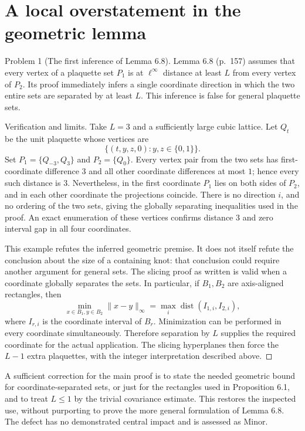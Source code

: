 \documentclass[10pt]{article}
\begin{document}
\section*{A local overstatement in the geometric lemma}
Problem 1 (The first inference of Lemma 6.8).  Lemma 6.8 (p. 157) assumes that every vertex of a plaquette set \(P_1\) is at \(\ell^\infty\) distance at least \(L\) from every vertex of \(P_2\). Its proof immediately infers a single coordinate direction in which the two entire sets are separated by at least \(L\). This inference is false for general plaquette sets.\par
Verification and limits. Take \(L=3\) and a sufficiently large cubic lattice. Let \(Q_t\) be the unit plaquette whose vertices are \[\{(t,y,z,0): y,z\in\{0,1\}\}.\] Set \(P_1=\{Q_{-3},Q_3\}\) and \(P_2=\{Q_0\}\). Every vertex pair from the two sets has first-coordinate difference \(3\) and all other coordinate differences at most \(1\); hence every such distance is \(3\). Nevertheless, in the first coordinate \(P_1\) lies on both sides of \(P_2\), and in each other coordinate the projections coincide. There is no direction \(i\), and no ordering of the two sets, giving the globally separating inequalities used in the proof. An exact enumeration of these vertices confirms distance \(3\) and zero interval gap in all four coordinates.\par
This example refutes the inferred geometric premise. It does not itself refute the conclusion about the size of a containing knot: that conclusion could require another argument for general sets. The slicing proof as written is valid when a coordinate globally separates the sets. In particular, if \(B_1,B_2\) are axis-aligned rectangles, then \[\min_{x\in B_1,y\in B_2}\|x-y\|_\infty
 =\max_i \operatorname{dist}(I_{1,i},I_{2,i}),\] where \(I_{r,i}\) is the coordinate interval of \(B_r\). Minimization can be performed in every coordinate simultaneously. Therefore separation by \(L\) supplies the required coordinate for the actual application. The slicing hyperplanes then force the \(L-1\) extra plaquettes, with the integer interpretation described above. ◻\par
A sufficient correction for the main proof is to state the needed geometric bound for coordinate-separated sets, or just for the rectangles used in Proposition 6.1, and to treat \(L\le1\) by the trivial covariance estimate. This restores the inspected use, without purporting to prove the more general formulation of Lemma 6.8. The defect has no demonstrated central impact and is assessed as Minor.\par
\end{document}
